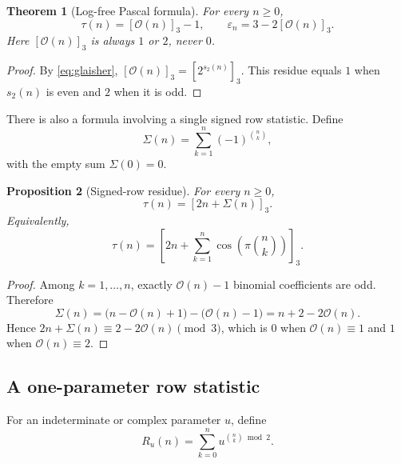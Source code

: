 \documentclass[11pt,oneside]{article}
\newtheorem{theorem}{Theorem}[section]
\newtheorem{proposition}[theorem]{Proposition}
\theoremstyle{definition}
\theoremstyle{remark}
\newcommand{\bitsum}{s_2}
\newcommand{\eps}{\varepsilon}
\begin{document}
\begin{theorem}[Log-free Pascal formula]\label{thm:log-free-pascal}
For every $n\ge0$,
\begin{equation}\label{eq:log-free-pascal}
 \boxed{\quad
 \tau(n)=[\mathcal O(n)]_3-1,
 \qquad
 \eps_n=3-2[\mathcal O(n)]_3.
 \quad}
\end{equation}
Here $[\mathcal O(n)]_3$ is always $1$ or $2$, never $0$.
\end{theorem}

\begin{proof}
By \cref{eq:glaisher},
$[\mathcal O(n)]_3=[2^{\bitsum(n)}]_3$.  This residue equals $1$ when
$\bitsum(n)$ is even and $2$ when it is odd.
\end{proof}

There is also a formula involving a single signed row statistic.  Define
\begin{equation}\label{eq:signed-row-statistic}
 \Sigma(n)=\sum_{k=1}^{n}(-1)^{\binom nk},
\end{equation}
with the empty sum $\Sigma(0)=0$.

\begin{proposition}[Signed-row residue]\label{prop:signed-row-residue}
For every $n\ge0$,
\begin{equation}\label{eq:signed-row-residue}
 \boxed{\qquad \tau(n)=[2n+\Sigma(n)]_3.\qquad}
\end{equation}
Equivalently,
\begin{equation}\label{eq:signed-row-trig}
 \tau(n)=\left[2n+\sum_{k=1}^{n}
          \cos\!\left(\pi\binom nk\right)\right]_3.
\end{equation}
\end{proposition}

\begin{proof}
Among $k=1,\ldots,n$, exactly $\mathcal O(n)-1$ binomial coefficients are odd.
Therefore
\[
 \Sigma(n)=\bigl(n-\mathcal O(n)+1\bigr)-\bigl(\mathcal O(n)-1\bigr)
          =n+2-2\mathcal O(n).
\]
Hence $2n+\Sigma(n)\equiv2-2\mathcal O(n)\pmod3$, which is $0$ when
$\mathcal O(n)\equiv1$ and $1$ when $\mathcal O(n)\equiv2$.
\end{proof}

\subsection{A one-parameter row statistic}

For an indeterminate or complex parameter $u$, define
\begin{equation}\label{eq:Ru-definition}
 R_u(n)=\sum_{k=0}^{n}u^{\binom nk\bmod2}.
\end{equation}
\end{document}
